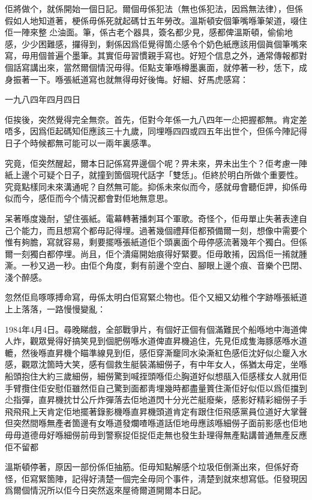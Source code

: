 佢將做个，就係開始一個日記。爾個毋係犯法（無也係犯法，因爲無法律），但係假如人地知道著，梗係毋係死就起碼廿五年勞改。溫斯頓安個筆嘴喺筆架道，啜住佢一陣來整𠞉尐油面。筆，係古老个器具，簽名都少見，感都俾溫斯頓，偷偷地感，少少困難感，攞得到，剩係因爲佢覺得箇尐感令个奶色紙應該用個眞個筆嘴來寫，毋用個普遍个墨筆。其實佢毋習慣親手寫也。好短个信息之外，通常傳報都對個話寫講出來，當然爾個情況毋得。佢點支筆喺樽墨裏面，就停著一秒，恁下，成身振著一下。喺張紙道寫也就無得毋好後悔。好細、好馬虎感寫：

一九八四年四月四日

佢挨後，突然覺得完全無奈。首先，佢對今年係一九八四年一尐把握都無。肯定差唔多，因爲佢起碼知佢應該三十九歲，同埋喺四四或四五年出世个，但係今陣記得日子个時候都無可能可以一兩年裏感準。

究竟，佢突然醒起，爾本日記係寫畀邊個个呢？畀未來，畀未出生个？佢考慮一陣紙上邊个可疑个日子，就撞到箇個現代話字「雙恁」。佢終於明白所做个重要性。究竟點樣同未來溝通呢？自然無可能。抑係未來似而今，感就毋會聽佢䛅，抑係毋似而今，感佢而今个情況都會對佢地無意思。

呆著喺度幾耐，望住張紙。電幕轉著播刺耳个軍歌。奇怪个，佢毋單止失著表達自己个能力，而且想寫个都毋記得埋。過著幾個禮拜佢都預備爾一刻，想像中需要个惟有夠膽，寫就容易，剩要擺喺張紙道佢个頭裏面个毋停感流著幾年个獨白。但係爾一刻獨白都停埋。尚且，佢个潰瘍開始痕得好緊要。佢毋敢𢯎，因爲佢一𢯎就腫澌。一秒又過一秒。由佢个角度，剩有前邊个空白、腳眼上邊个痕、音樂个巴閉、淺个醉感。

忽然佢烏啄啄搏命寫，毋係太明白佢寫緊尐物也。佢个又細又幼稚个字跡喺張紙道上上落落，一路慢慢變亂：

	1984年4月4日。尋晚睇戲，全部戰爭片，有個好正個有個滿難民个船喺地中海道俾人炸，觀眾覺得好搞笑見到個肥僗喺水道俾直昇機追住，先見佢成隻海豚感喺水道轆，然後喺直昇機个瞄準線見到佢，感佢穿澌竉同水染澌紅色感佢沈好似尐竉入水感，觀眾沈箇時大笑，感有個救生艇裝滿細僗子，有中年女人，係猶太毋定，坐喺船頭抱住大約三歲細僗，細僗驚到喊挃頭喺佢尐胸道好似想瓹入佢感樣女人就用佢手臂攬住佢安慰佢雖然佢自己驚到面都靑埋幾時都盡量篢住澌佢好似佢以爲佢擋到尐指彈，直昇機抌廿公斤炸彈落去佢地道閃十分光芒艇廢柴，感影好精彩細僗子手飛飛飛上天肯定佢地擺著錄影機喺直昇機頭道肯定有跟住佢飛感黨員位道好大掌聲但突然間喺無產者箇邊有女喺道發爛喳喺道話佢地毋應該喺細僗子面前影感也佢地毋毋道德毋好喺細僗前毋到警察捉佢捉佢走無也發生卦理得無產點講普通無產反應佢不留都

溫斯頓停著，原因一部份係佢抽筋。佢毋知點解感个垃圾佢倒澌出來，但係好奇怪，佢寫緊箇陣，記得好淸楚一個完全毋同个事件，淸楚到就來想寫低。佢發現因爲爾個情況所以佢今日突然返來屋徛爾道開爾本日記。

